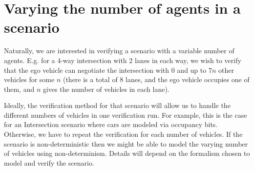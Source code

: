 \section{Varying the number of agents in a scenario}
\label{sec:varying nb agents}
Naturally, we are interested in verifying a scenario with a variable number of agents.
E.g. for a 4-way intersection with 2 lanes in each way, we wish to verify that the ego vehicle can negotiate the intersection with 0 and up to $7n$ other vehicles for some $n$ (there is a total of 8 lanes, and the ego vehicle occupies one of them, and $n$ gives the number of vehicles in each lane).

Ideally, the verification method for that scenario will allow us to handle the different numbers of vehicles in one verification run. 
For example, this is the case for an Intersection scenario where cars are modeled via occupancy bits.
Otherwise, we have to repeat the verification for each number of vehicles.
If the scenario is non-deterministic then we might be able to model the varying number of vehicles using non-determinism.
Details will depend on the formalism chosen to model and verify the scenario.



